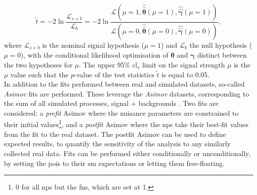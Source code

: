 \begin{equation}
    \tilde{t} = -2 \ln \frac{\mathcal{L}_{s+b}}{\mathcal{L}_{b}} = -2 \ln \frac{\mathcal{L}\left(\mu = 1, \hat{\hat{\boldsymbol{\theta}}}(\mu = 1), \hat{\hat{\boldsymbol{\gamma}}}(\mu = 1) \right)}{\mathcal{L}\left(\mu = 0, \hat{\hat{\boldsymbol{\theta}}}(\mu = 0), \hat{\hat{\boldsymbol{\gamma}}}(\mu = 0) \right)},
\end{equation}
where $\mathcal{L}_{s+b}$ is the nominal signal hypothesis ($\mu = 1$) and $\mathcal{L}_{b}$ the null hypothesis ($\mu = 0$), with the conditional likelihood optimisation of $\boldsymbol{\theta}$ and $\boldsymbol{\gamma}$ distinct between the two hypotheses for $\mu$. The upper 95\% \gls{cl}$_s$ limit on the signal strength $\mu$ is the $\mu$ value such that the $p$-value of the test statistics $\tilde{t}$ is equal to 0.05.\\

In addition to the fits performed between real and simulated datasets, so-called \textit{Asimov} fits are performed. These leverage the \textit{Asimov} datasets, corresponding to the sum of all simulated processes, signal + backgrounds \cite{asympForm}. Two fits are considered: a \textit{prefit} Asimov where the nuisance parameters are constrained to their initial values\footnote{0 for all \glspl{np} but the \glspl{fn}, which are set at 1.}, and a \textit{postfit} Asimov where the \glspl{np} take their best-fit values from the fit to the real dataset. The postfit Asimov can be used to define expected results, to quantify the sensitivity of the analysis to any similarly collected real data. Fits can be performed either conditionally or unconditionally, by setting the \glspl{poi} to their \gls{sm} expectations or letting them free-floating. 


